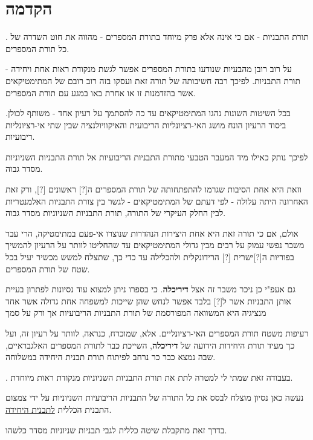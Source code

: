 \newpage

\section*{הקדמה}

. תורת התבניות - אם כי אינה אלא פרק מיוחד בתורת המספרים - מהווה את חוט השדרה של כל תורת המספרים.

\medskip
על רוב רובן מהבעיות שנודעו בתורת המספרים אפשר לגשת מנקודת ראות אחת ויחידה - תורת התבניות. לפיכך רבה חשיבותה של תורה זאת ועסקו בזה רוב רובם של המתימטיקאים אשר בהזדמנות זו או אחרת באו במגע עם תורת המספרים.

\medskip
בכל השיטות השונות נהגו המתימטיקאים עד כה להסתמך על רעיון אחד - משותף לכולן. ביסוד הרעיון הונח מושג האי-רציונליות הריבועית והאיקוויולנציה שבין שתי אי-רציונליות ריבועיות.

\medskip
לפיכך נותק כאילו מיד המעבר הטבעי מתורת התבניות הריבועיות אל תורת התבניות השניוניות מסדר גבוה.

\medskip
וזאת היא אחת הסיבות שגרמו להתפתחותה של תורת המספרים ה[?] ראשונים [?], ורק זאת האחרונה היתה עלולה - לפי דעתם של המתימטיקאים - לגשר בין צורת התבניות האלמנטריות לבין החלק העיקרי של התורה, תורת התבניות השניוניות מסדר גבוה.

\medskip
אולם, אם כי תורה זאת היא אחת היצירות הנהדרות שנוצרו אי-פעם במתימטיקה, הרי עבר משבר נפשי עמוק על רבים מבין גדולי המתימטיקאים עד שהחליטו לוותר על הרעיון להמשיך בפוריות ה[?]ישרית [?] הרידונקלית ולהכלילה עד כדי כך, שתצלח למשש מכשיר יעיל בכל שטח של תורת המספרים.

\medskip
גם אעפ"י כן ניכר משבר זה אצל \textbf{דיריכלה}. כי בספרו ניתן למצוא עוד נסיונות לפתרון בעיית אותן התבניות אשר ל[?] בלבד אפשר לנחש שהן שייכות למשפחה אחת גדולה אשר אחד מנציגיה היא המשוואה המפורסמת של תורת התבניות הריבועיות אך ורק על סמך

רעיפות משטח תורת המספרים האי-רציונליים. אלא, שמוכרח, כנראה, לוותר על רעיון זה, ועל כך מעיד תורת היחידות הידועה של \textbf{דיריכלה}, השייכת כבר לתורת המספרים האלגבראיים, שבה נמצא כבר כר נרחב לפיתוח תורת תבנית היחידה במשלוחה.

\medskip
{}. בעבודה זאת שמתי לי למטרה לתת את תורת התבניות השניוניות מנקודת ראות מיוחדת.

\medskip
נעשה כאן נסיון מוצלח לבסס את כל התורה של התבניות הריבועיות השניוניות על ידי צמצום התבנית הכללית \underline{לתבנית היחידה}.

\medskip
בדרך זאת מתקבלת שיטה כללית לגבי תבניות שניוניות מסדר כלשהו.

